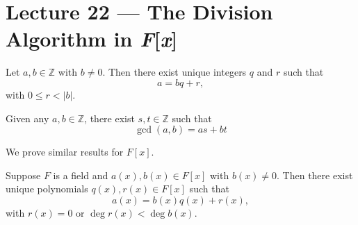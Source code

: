 \section{Lecture 22 — The Division Algorithm in \textit{F}[\textit{x}]}

\begin{theorem}
	Let $a,b\in\mathbb Z$ with $b\neq 0$. Then there exist unique integers $q$ and $r$ such that
	$$a=bq+r,$$
	with $0\leq r<|b|$.
\end{theorem}

\begin{theorem}
	Given any $a,b\in\mathbb Z$, there exist $s,t\in\mathbb Z$ such that
	$$\gcd(a,b)=as+bt$$
\end{theorem}

We prove similar results for $F[x]$.

\begin{theorem}
	Suppose $F$ is a field and $a(x),b(x)\in F[x]$ with $b(x)\neq 0$. Then there exist unique polynomials $q(x),r(x)\in F[x]$ such that $$a(x)=b(x)q(x)+r(x),$$
	with $r(x)=0$ or $\deg r(x)<\deg b(x)$.
\end{theorem}

